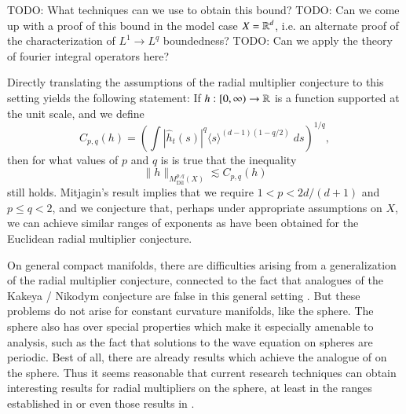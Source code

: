 TODO: What techniques can we use to obtain this bound? TODO: Can we come up with a proof of this bound in the model case $X = \operatorname{\mathbb{R}}^d$, i.e. an alternate proof of the characterization of $L^1 \to L^q$ boundedness? TODO: Can we apply the theory of fourier integral operators here?
%
%
%

Directly translating the assumptions of the radial multiplier conjecture to this setting yields the following statement: If $h: [0,\infty) \to \operatorname{\mathbb{R}}$ is a function supported at the unit scale, and we define
%
\[ C_{p,q}(h) = \left( \int |\widehat{h}_t(s)|^q \langle s \rangle^{(d-1)(1 - q/2)}\; ds \right)^{1/q}, \]
%
then for what values of $p$ and $q$ is is true that the inequality
%
\[ \| h \|_{M^{p,q}_{\text{Dil}}(X)} \lesssim C_{p,q}(h) \]
%
still holds. Mitjagin's result implies that we require $1 < p < 2d/(d+1)$ and $p \leq q < 2$, and we conjecture that, perhaps under appropriate assumptions on $X$, we can achieve similar ranges of exponents as have been obtained for the Euclidean radial multiplier conjecture.

On general compact manifolds, there are difficulties arising from a generalization of the radial multiplier conjecture, connected to the fact that analogues of the Kakeya / Nikodym conjecture are false in this general setting \cite{Minicozzi}. But these problems do not arise for constant curvature manifolds, like the sphere. The sphere also has over special properties which make it especially amenable to analysis, such as the fact that solutions to the wave equation on spheres are periodic. Best of all, there are already results which achieve the analogue of \cite{GarrigosandSeeger} on the sphere. Thus it seems reasonable that current research techniques can obtain interesting results for radial multipliers on the sphere, at least in the ranges established in \cite{HeoandNazarovandSeeger} or even those results in \cite{Cladek}.

